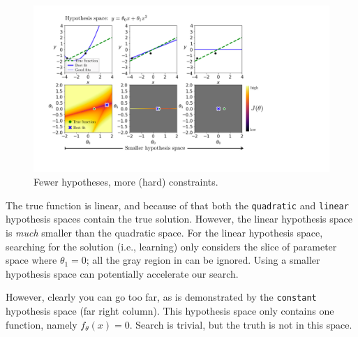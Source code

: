 \begin{figure}[t]
    \centerline{
    \includegraphics[width=1.0\linewidth]{./figures/problem_of_generalization/fewer_hypotheses_more_constraints.pdf}
    }
    \caption{Fewer hypotheses, more (hard) constraints.}
    \label{fig:problem_of_generalization:fewer_hypotheses_more_constraints}
\end{figure}

The true function is linear, and because of that both the \texttt{quadratic} and \texttt{linear} hypothesis spaces contain the true solution. However, the linear hypothesis space is \textit{much} smaller than the quadratic space. For the linear hypothesis space, searching for the solution (i.e., learning) only considers the slice of parameter space where $\theta_1=0$; all the gray region in \fig{\ref{fig:problem_of_generalization:fewer_hypotheses_more_constraints}} can be ignored. Using a smaller hypothesis space can potentially accelerate our search. %

However, clearly you can go too far, as is demonstrated by the \texttt{constant} hypothesis space (far right column). This hypothesis space only contains one function, namely $f_{\theta}(x) = 0$. Search is trivial, but the truth is not in this space.

